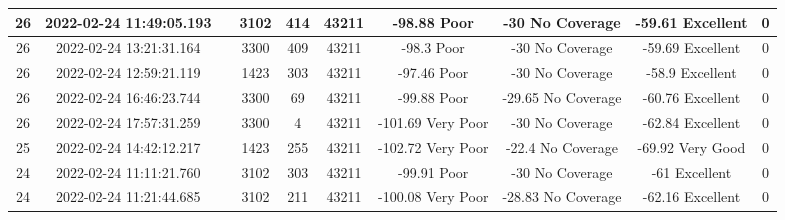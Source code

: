 \begin{longtable*}{|c|c|c|c|c|c|c|c|c|c|}
26&2022-02-24 11:49:05.193&&3102&414&43211& -98.88    Poor        & -30       No Coverage & -59.61    Excellent   & 0\\\hline
{}26&2022-02-24 13:21:31.164&&3300&409&43211& -98.3     Poor        & -30       No Coverage & -59.69    Excellent   & 0\\\hline
{}26&2022-02-24 12:59:21.119&&1423&303&43211& -97.46    Poor        & -30       No Coverage & -58.9     Excellent   & 0\\\hline
{}26&2022-02-24 16:46:23.744&&3300&69&43211& -99.88    Poor        & -29.65    No Coverage & -60.76    Excellent   & 0\\\hline
{}26&2022-02-24 17:57:31.259&&3300&4&43211& -101.69   Very Poor   & -30       No Coverage & -62.84    Excellent   & 0\\\hline
{}25&2022-02-24 14:42:12.217&&1423&255&43211& -102.72   Very Poor   & -22.4     No Coverage & -69.92    Very Good   & 0\\\hline
{}24&2022-02-24 11:11:21.760&&3102&303&43211& -99.91    Poor        & -30       No Coverage & -61       Excellent   & 0\\\hline
{}24&2022-02-24 11:21:44.685&&3102&211&43211& -100.08   Very Poor   & -28.83    No Coverage & -62.16    Excellent   & 0\\\hline

\end{longtable*}
